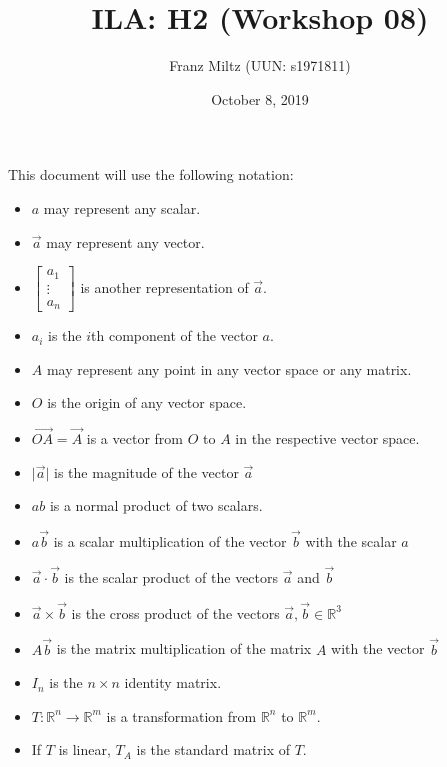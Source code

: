 \documentclass{article}
\title{ILA: H2 (Workshop 08)}
\author{Franz Miltz (UUN: s1971811)}
\date{October 8, 2019}
\begin{document}
\maketitle
This document will use the following notation:
\begin{itemize}
    \item $a$ may represent any scalar.
    \item $\vec{a}$ may represent any vector.
    \item $\begin{bmatrix}
                  a_1    \\
                  \vdots \\
                  a_n
              \end{bmatrix}$ is another representation of $\vec a$.
    \item $a_i$ is the $i$th component of the vector $a$.
    \item $A$ may represent any point in any vector space or any matrix.
    \item $O$ is the origin of any vector space.
    \item $\vec{OA}=\vec{A}$ is a vector from $O$ to $A$ in the respective vector space.
    \item $\vert\vec{a}\vert$ is the magnitude of the vector $\vec{a}$
    \item $ab$ is a normal product of two scalars.
    \item $a\vec{b}$ is a scalar multiplication of the vector $\vec{b}$ with the scalar $a$
    \item $\vec{a}\cdot\vec{b}$ is the scalar product of the vectors $\vec{a}$ and $\vec{b}$
    \item $\vec a\times\vec b$ is the cross product of the vectors $\vec a, \vec b \in \mathbb{R}^3$
    \item $A\vec b$ is the matrix multiplication of the matrix $A$ with the vector $\vec b$
    \item $I_n$ is the $n\times n$ identity matrix.
    \item $T:\mathbb{R}^n\to\mathbb{R}^m$ is a transformation from $\mathbb{R}^n$ to $\mathbb{R}^m$.
    \item If $T$ is linear, $T_A$ is the standard matrix of $T$.
\end{itemize}
\end{document}

